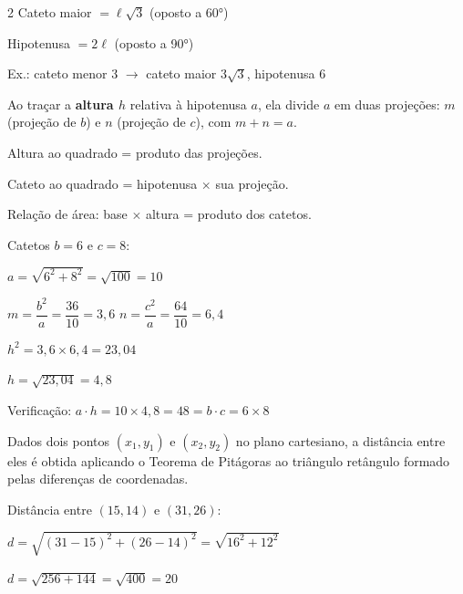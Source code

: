 \documentclass[12pt]{article}
\begin{document}
\begin{multicols}{2}
Cateto maior $= \ell\sqrt{3}$ (oposto a 60°)

Hipotenusa $= 2\ell$ (oposto a 90°)


Ex.: cateto menor 3 $\rightarrow$ cateto maior $3\sqrt{3}$, hipotenusa 6


Ao traçar a \textbf{altura $h$} relativa à hipotenusa $a$, ela divide $a$ em duas projeções: $m$ (projeção de $b$) e $n$ (projeção de $c$), com $m + n = a$.



Altura ao quadrado = produto das projeções.


Cateto ao quadrado = hipotenusa $\times$ sua projeção.



Relação de área: base $\times$ altura = produto dos catetos.

 Catetos $b = 6$ e $c = 8$:

$a = \sqrt{6^2 + 8^2} = \sqrt{100} = 10$

$m = \dfrac{b^2}{a} = \dfrac{36}{10} = 3{,}6$ \quad $n = \dfrac{c^2}{a} = \dfrac{64}{10} = 6{,}4$

$h^2 = 3{,}6 \times 6{,}4 = 23{,}04$

$h = \sqrt{23{,}04} = 4{,}8$

Verificação: $a \cdot h = 10 \times 4{,}8 = 48 = b \cdot c = 6 \times 8$ \checkmark


Dados dois pontos $(x_1, y_1)$ e $(x_2, y_2)$ no plano cartesiano, a distância entre eles é obtida aplicando o Teorema de Pitágoras ao triângulo retângulo formado pelas diferenças de coordenadas.



Distância entre $(15, 14)$ e $(31, 26)$:

$d = \sqrt{(31-15)^2 + (26-14)^2} = \sqrt{16^2 + 12^2}$

$d = \sqrt{256 + 144} = \sqrt{400} = 20$


\end{multicols}
\end{document}
